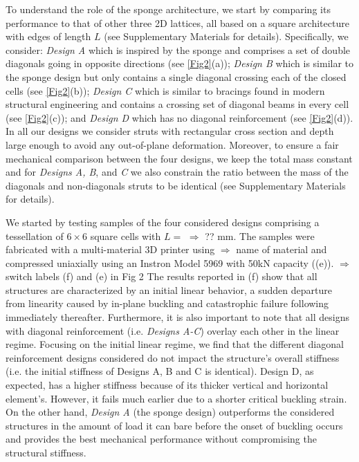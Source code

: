 \documentclass[9pt,twocolumn,twoside]{fernandes_paper}
\newcommand{\KB}[1]{\noindent\color{blue}$\Longrightarrow$ #1\normalcolor}
\newcommand{\mf}[1]{\noindent\color{orange}{$\Longrightarrow$#1}\normalcolor}
\begin{document}
 



To understand  the role of the sponge architecture, we start by comparing its performance to that of other three 2D lattices, all based on a   square architecture with edges of length $L$ (see Supplementary Materials for details). Specifically,  we  consider:
\emph{Design A}  which is inspired by the sponge and comprises a set of double diagonals going in opposite directions (see \cref{Fig2}(a)); \emph{Design B}  which is similar to the sponge design but only contains a single diagonal crossing each of the closed cells (see \cref{Fig2}(b));   \emph{Design C}  which is similar to bracings found in modern structural engineering and contains a crossing set of diagonal beams in every cell (see \cref{Fig2}(c)); and \emph{Design D}  which  has no diagonal reinforcement (see \cref{Fig2}(d)). In all our designs we consider struts with rectangular cross section and depth large enough to avoid any out-of-plane deformation. Moreover, to ensure a fair mechanical comparison between the four designs, we keep the total mass constant and
for \emph{Designs A, B}, and \emph{C} we also constrain the  ratio between the mass of the diagonals and non-diagonals struts to be identical (see Supplementary Materials for details).  %



We started by testing samples of the four considered designs comprising
a tessellation of $6\times6$ square cells with $L=$ \KB{??} mm. The samples were fabricated with a multi-material \mf{@Katia: what do you mean multi-material} 3D printer \mf{(add model @James)} using \KB{name of material} \mf{add info here @James} and compressed uniaxially  using  an Instron Model 5969 with 50kN capacity  ((e)). \KB{switch labels (f) and (e) in Fig 2} %
The results reported in (f)  show that all structures are characterized by an initial linear behavior, a sudden departure from linearity caused by in-plane buckling and catastrophic failure following immediately thereafter.   Furthermore, it is also important to note that all  designs with diagonal reinforcement (i.e. \emph{Designs A-C}) overlay each other in the linear regime. Focusing on the initial linear regime, we find that  the different diagonal reinforcement designs considered do not impact the structure's overall stiffness (i.e. the initial stiffness of Designs A, B and C is identical). Design D, as expected, has a higher stiffness because of its thicker vertical and horizontal element's. However, it fails much earlier due to a shorter critical buckling strain. On the other hand, \emph{Design A} (the sponge design) outperforms the  considered structures in the amount of load it can bare before the onset of buckling occurs and provides the best mechanical performance without compromising the structural stiffness.
\end{document}
